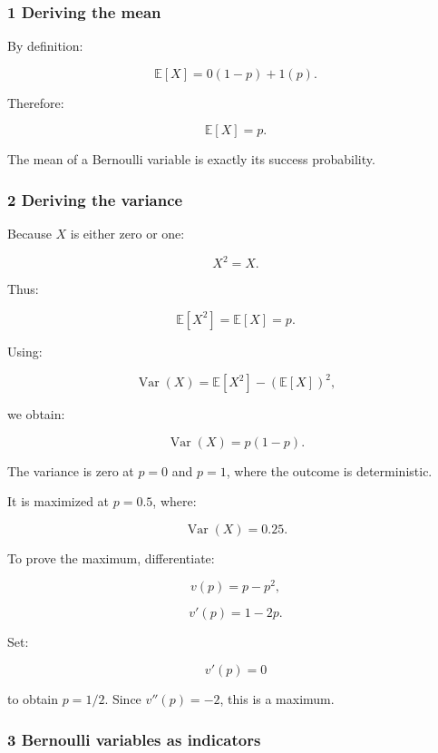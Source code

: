 \subsubsection{1 Deriving the mean}\label{02-foundations-ii-ch023-deriving-the-mean}

\hypertarget{02-foundations-ii-ch023-deriving-the-mean}{}

By definition:

\[
 \mathbb E[X] = 0(1-p)+1(p).
\]

Therefore:

\[
 \boxed{\mathbb E[X]=p}.
\]

The mean of a Bernoulli variable is exactly its success probability.

\subsubsection{2 Deriving the variance}\label{02-foundations-ii-ch023-deriving-the-variance}

\hypertarget{02-foundations-ii-ch023-deriving-the-variance}{}

Because \(X\) is either zero or one:

\[
 X^2=X.
\]

Thus:

\[
 \mathbb E[X^2]=\mathbb E[X]=p.
\]

Using:

\[
 \operatorname{Var}(X)= \mathbb E[X^2]-(\mathbb E[X])^2,
\]

we obtain:

\[
 \boxed{ \operatorname{Var}(X)=p(1-p) }.
\]

The variance is zero at \(p=0\) and \(p=1\), where the outcome is deterministic.

It is maximized at \(p=0.5\), where:

\[
 \operatorname{Var}(X)=0.25.
\]

To prove the maximum, differentiate:

\[
 v(p)=p-p^2,
\]

\[
 v'(p)=1-2p.
\]

Set:

\[
 v'(p)=0
\]

to obtain \(p=1/2\). Since \(v''(p)=-2\), this is a maximum.

\subsubsection{3 Bernoulli variables as indicators}\label{02-foundations-ii-ch023-bernoulli-variables-as-indicators}

